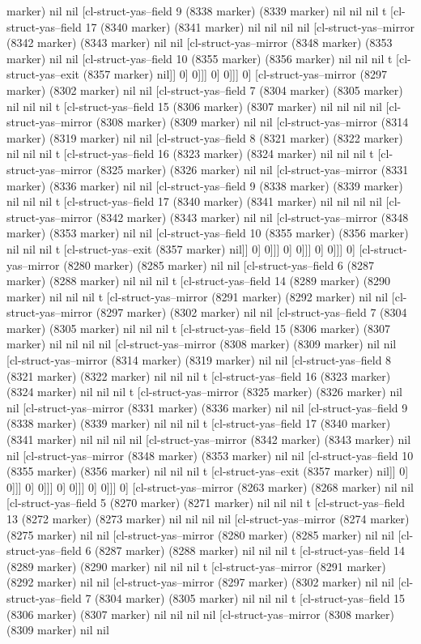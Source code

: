 {{marker) nil nil [cl-struct-yas--field 9 (8338 marker) (8339 marker) nil nil nil t [cl-struct-yas--field 17 (8340 marker) (8341 marker) nil nil nil nil [cl-struct-yas--mirror (8342 marker) (8343 marker) nil nil [cl-struct-yas--mirror (8348 marker) (8353 marker) nil nil [cl-struct-yas--field 10 (8355 marker) (8356 marker) nil nil nil t [cl-struct-yas--exit (8357 marker) nil]] 0] 0]]] 0] 0]]] 0] [cl-struct-yas--mirror (8297 marker) (8302 marker) nil nil [cl-struct-yas--field 7 (8304 marker) (8305 marker) nil nil nil t [cl-struct-yas--field 15 (8306 marker) (8307 marker) nil nil nil nil [cl-struct-yas--mirror (8308 marker) (8309 marker) nil nil [cl-struct-yas--mirror (8314 marker) (8319 marker) nil nil [cl-struct-yas--field 8 (8321 marker) (8322 marker) nil nil nil t [cl-struct-yas--field 16 (8323 marker) (8324 marker) nil nil nil t [cl-struct-yas--mirror (8325 marker) (8326 marker) nil nil [cl-struct-yas--mirror (8331 marker) (8336 marker) nil nil [cl-struct-yas--field 9 (8338 marker) (8339 marker) nil nil nil t [cl-struct-yas--field 17 (8340 marker) (8341 marker) nil nil nil nil [cl-struct-yas--mirror (8342 marker) (8343 marker) nil nil [cl-struct-yas--mirror (8348 marker) (8353 marker) nil nil [cl-struct-yas--field 10 (8355 marker) (8356 marker) nil nil nil t [cl-struct-yas--exit (8357 marker) nil]] 0] 0]]] 0] 0]]] 0] 0]]] 0] [cl-struct-yas--mirror (8280 marker) (8285 marker) nil nil [cl-struct-yas--field 6 (8287 marker) (8288 marker) nil nil nil t [cl-struct-yas--field 14 (8289 marker) (8290 marker) nil nil nil t [cl-struct-yas--mirror (8291 marker) (8292 marker) nil nil [cl-struct-yas--mirror (8297 marker) (8302 marker) nil nil [cl-struct-yas--field 7 (8304 marker) (8305 marker) nil nil nil t [cl-struct-yas--field 15 (8306 marker) (8307 marker) nil nil nil nil [cl-struct-yas--mirror (8308 marker) (8309 marker) nil nil [cl-struct-yas--mirror (8314 marker) (8319 marker) nil nil [cl-struct-yas--field 8 (8321 marker) (8322 marker) nil nil nil t [cl-struct-yas--field 16 (8323 marker) (8324 marker) nil nil nil t [cl-struct-yas--mirror (8325 marker) (8326 marker) nil nil [cl-struct-yas--mirror (8331 marker) (8336 marker) nil nil [cl-struct-yas--field 9 (8338 marker) (8339 marker) nil nil nil t [cl-struct-yas--field 17 (8340 marker) (8341 marker) nil nil nil nil [cl-struct-yas--mirror (8342 marker) (8343 marker) nil nil [cl-struct-yas--mirror (8348 marker) (8353 marker) nil nil [cl-struct-yas--field 10 (8355 marker) (8356 marker) nil nil nil t [cl-struct-yas--exit (8357 marker) nil]] 0] 0]]] 0] 0]]] 0] 0]]] 0] 0]]] 0] [cl-struct-yas--mirror (8263 marker) (8268 marker) nil nil [cl-struct-yas--field 5 (8270 marker) (8271 marker) nil nil nil t [cl-struct-yas--field 13 (8272 marker) (8273 marker) nil nil nil nil [cl-struct-yas--mirror (8274 marker) (8275 marker) nil nil [cl-struct-yas--mirror (8280 marker) (8285 marker) nil nil [cl-struct-yas--field 6 (8287 marker) (8288 marker) nil nil nil t [cl-struct-yas--field 14 (8289 marker) (8290 marker) nil nil nil t [cl-struct-yas--mirror (8291 marker) (8292 marker) nil nil [cl-struct-yas--mirror (8297 marker) (8302 marker) nil nil [cl-struct-yas--field 7 (8304 marker) (8305 marker) nil nil nil t [cl-struct-yas--field 15 (8306 marker) (8307 marker) nil nil nil nil [cl-struct-yas--mirror (8308 marker) (8309 marker) nil nil }}
